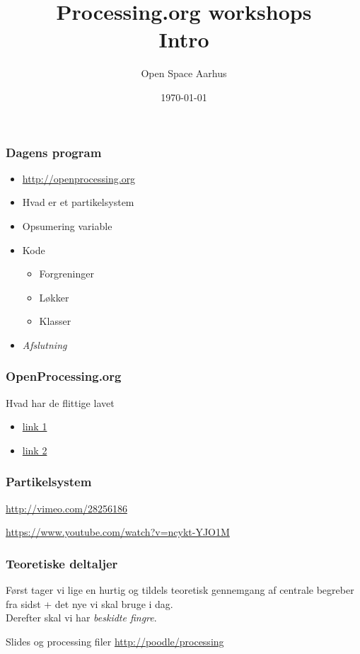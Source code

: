 \documentclass{beamer}
\title{Processing.org workshops\\Intro}
\author{Open Space Aarhus}
\date{\today}
\institute[Bryggervej 30]{Bryggervej 30, 8240 Århus N}
\begin{document}
\begin{frame}[label=titlepage]
  \titlepage
\end{frame}

\begin{frame}
  \frametitle{Dagens program}
  \begin{itemize}
  \item \url{http://openprocessing.org}
  \item Hvad er et partikelsystem
  \item Opsumering variable
  \item Kode
    \begin{itemize}
    \item Forgreninger
    \item Løkker
    \item Klasser
    \end{itemize}

  \item \emph{Afslutning}
    
  \end{itemize}						
\end{frame}


\begin{frame}
  \frametitle{OpenProcessing.org}
  \begin{block}{Hvad har de flittige lavet}
    \begin{itemize}
    \item \url{link 1}
    \item \url{link 2}
    \end{itemize}
  \end{block}
\end{frame}



\begin{frame}
  \frametitle{Partikelsystem}

  \url{http://vimeo.com/28256186}  

  \url{https://www.youtube.com/watch?v=ncykt-YJO1M}
\end{frame}


\begin{frame}
  \frametitle{Teoretiske deltaljer}
  
  Først tager vi lige en hurtig og tildels teoretisk gennemgang af
  centrale begreber fra sidst + det nye vi skal bruge i dag. \\
\vspace{2cm}
Derefter skal vi har \emph{beskidte fingre}.

\begin{block}{Slides og processing filer}
\url{http://poodle/processing}   
\end{block}

\end{frame}
\end{document}
